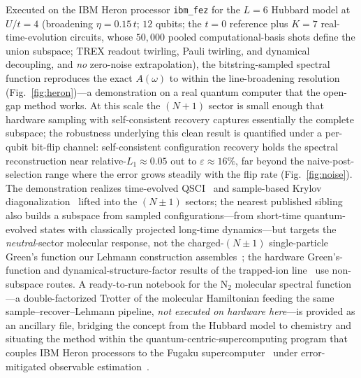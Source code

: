 Executed on the IBM Heron processor \texttt{ibm\_fez} for the $L=6$ Hubbard model at $U/t=4$ (broadening
$\eta=0.15\,t$; $12$ qubits; the $t=0$ reference plus $K=7$ real-time-evolution circuits, whose $50{,}000$
pooled computational-basis shots define the union subspace; TREX readout twirling, Pauli twirling, and
dynamical decoupling, and \emph{no} zero-noise extrapolation), the bitstring-sampled spectral function
reproduces the exact $A(\omega)$ to within the line-broadening resolution
(Fig.~\ref{fig:heron})---a demonstration on a real quantum computer that the open-gap method works.
At this scale the $(N{+}1)$ sector is small enough that hardware sampling with self-consistent
recovery captures essentially the complete subspace; the robustness underlying this clean result is
quantified under a per-qubit bit-flip channel: self-consistent configuration recovery holds the
spectral reconstruction near relative-$L_1\approx0.05$ out to $\varepsilon\approx16\%$, far beyond the
naive-post-selection range where the error grows steadily with the flip rate (Fig.~\ref{fig:noise}). The demonstration realizes time-evolved QSCI~\cite{teqsci2024} and
sample-based Krylov diagonalization~\cite{skqd2025,kirby2023,yoshioka2025} lifted into the
$(N{\pm}1)$ sectors; the nearest published sibling also builds a subspace from
sampled configurations---from short-time quantum-evolved states with classically projected long-time
dynamics---but targets the \emph{neutral}-sector molecular response, not the charged-$(N{\pm}1)$
single-particle Green's function our Lehmann construction assembles~\cite{santini2025}; the hardware Green's-function and dynamical-structure-factor
results of the trapped-ion line~\cite{greenediniz2024,quantinuum_dsf2026} use non-subspace routes.
A ready-to-run notebook for the $\mathrm{N_2}$ molecular spectral function---a
double-factorized Trotter of the molecular Hamiltonian feeding the same sample--recover--Lehmann
pipeline, \emph{not executed on hardware here}---is provided as an ancillary file, bridging the concept from the Hubbard model to
chemistry and situating the method within the quantum-centric-supercomputing program that couples IBM
Heron processors to the Fugaku supercomputer~\cite{robledomoreno2025,shirakawa2025} under
error-mitigated observable estimation~\cite{qesem2025,algorithmiq2026}.

